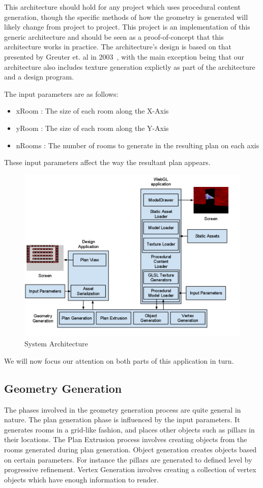 This architecture should hold for any project which uses procedural content generation, though the specific methods of how the geometry is generated will likely change from project to project.
This project is an implementation of this generic architecture and should be seen as a proof-of-concept that this architecture works in practice.
The architecture's design is based on that presented by Greuter et. al in 2003~\cite{greuter2003undiscovered}, with the main exception being that our architecture also includes texture generation explictly as part of the architecture and a design program.

The input parameters are as follows:
\begin{itemize}
	\item xRoom : The size of each room along the X-Axis
	\item yRoom : The size of each room along the Y-Axis
	\item nRooms : The number of rooms to generate in the resulting plan on each axis
\end{itemize}
These input parameters affect the way the resultant plan appears.

\begin{figure}
  \centering
  \includegraphics[width=\textwidth]{images/gwtprocArchitecture}
  \caption{System Architecture}
  \label{fig:sysarch}
\end{figure}

We will now focus our attention on both parts of this application in turn.

\subsection{Geometry Generation}
\label{sec:desgeomgen}
The phases involved in the geometry generation process are quite general in nature.
The plan generation phase is influenced by the input parameters.
It generates rooms in a grid-like fashion, and places other objects such as pillars in their locations.
The Plan Extrusion process involves creating objects from the rooms generated during plan generation.
Object generation creates objects based on certain parameters.
For instance the pillars are generated to defined level by progressive refinement.
Vertex Generation involves creating a collection of vertex objects which have enough information to render.

